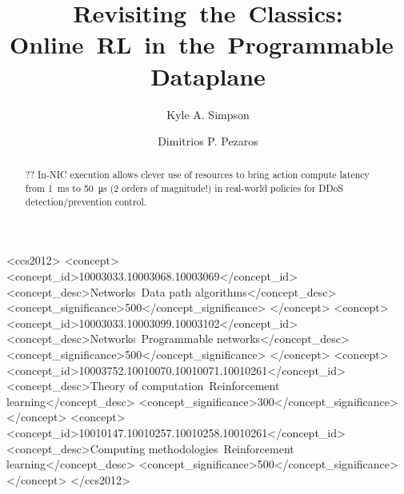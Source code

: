\documentclass[sigconf,natbib=false]{acmart}
\begin{document}
	\title{Revisiting~the~Classics: Online~RL~in~the~Programmable~Dataplane}
	
	
	 \author{Kyle A. Simpson}
	 \author{Dimitrios P. Pezaros}
	
\renewcommand{\shortauthors}{Simpson \emph{et al}.}
	
\begin{abstract}
?? In-NIC execution allows clever use of resources to bring action compute latency  from \SI{1}{\milli\second} to \SI{50}{\micro\second} (2 orders of magnitude!) in real-world policies for DDoS detection/prevention control.
\end{abstract}

\begin{CCSXML}
	<ccs2012>
	<concept>
	<concept_id>10003033.10003068.10003069</concept_id>
	<concept_desc>Networks~Data path algorithms</concept_desc>
	<concept_significance>500</concept_significance>
	</concept>
	<concept>
	<concept_id>10003033.10003099.10003102</concept_id>
	<concept_desc>Networks~Programmable networks</concept_desc>
	<concept_significance>500</concept_significance>
	</concept>
	<concept>
	<concept_id>10003752.10010070.10010071.10010261</concept_id>
	<concept_desc>Theory of computation~Reinforcement learning</concept_desc>
	<concept_significance>300</concept_significance>
	</concept>
	<concept>
	<concept_id>10010147.10010257.10010258.10010261</concept_id>
	<concept_desc>Computing methodologies~Reinforcement learning</concept_desc>
	<concept_significance>500</concept_significance>
	</concept>
	</ccs2012>
\end{CCSXML}


	
\maketitle
\end{document}
